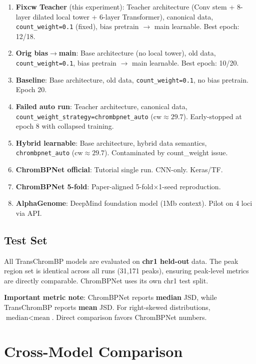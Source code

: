 \documentclass[11pt,a4paper]{article}
\begin{document}
\begin{enumerate}
\item \textbf{Fixcw Teacher} (this experiment): Teacher architecture (Conv stem + 8-layer dilated local tower + 6-layer Transformer), canonical data, \texttt{count\_weight=0.1} (fixed), bias pretrain $\to$ main learnable. Best epoch: 12/18.
\item \textbf{Orig bias$\to$main}: Base architecture (no local tower), old data, \texttt{count\_weight=0.1}, bias pretrain $\to$ main learnable. Best epoch: 10/20.
\item \textbf{Baseline}: Base architecture, old data, \texttt{count\_weight=0.1}, no bias pretrain. Epoch 20.
\item \textbf{Failed auto run}: Teacher architecture, canonical data, \texttt{count\_weight\_strategy=chrombpnet\_auto} ($\text{cw}\approx29.7$). Early-stopped at epoch 8 with collapsed training.
\item \textbf{Hybrid learnable}: Base architecture, hybrid data semantics, \texttt{chrombpnet\_auto} ($\text{cw}\approx29.7$). Contaminated by count\_weight issue.
\item \textbf{ChromBPNet official}: Tutorial single run. CNN-only. Keras/TF.
\item \textbf{ChromBPNet 5-fold}: Paper-aligned 5-fold$\times$1-seed reproduction.
\item \textbf{AlphaGenome}: DeepMind foundation model (1Mb context). Pilot on 4 loci via API.
\end{enumerate}

\subsection{Test Set}

All TransChromBP models are evaluated on \textbf{chr1 held-out} data. The peak region set is identical across all runs (31,171 peaks), ensuring peak-level metrics are directly comparable. ChromBPNet uses its own chr1 test split.

\textbf{Important metric note}: ChromBPNet reports \textbf{median} JSD, while TransChromBP reports \textbf{mean} JSD. For right-skewed distributions, $\text{median} < \text{mean}$. Direct comparison favors ChromBPNet numbers.

\section{Cross-Model Comparison}
\end{document}
